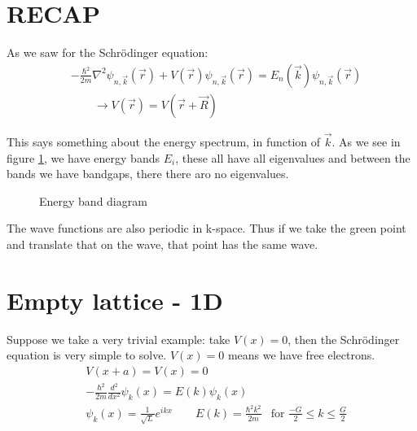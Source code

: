 \section{RECAP}
As we saw for the Schrödinger equation:
\begin{align}
    &-\frac{\hbar^2}{2m}\nabla^2\psi_{n, \vec{k}}(\vec{r}) + V(\vec{r})\psi_{n, \vec{k}}(\vec{r}) = E_n(\vec{k})\psi_{n, \vec{k}}(\vec{r}) \\
    & \qquad \rightarrow V(\vec{r}) = V(\vec{r} + \vec{R})
\end{align}

This says something about the energy spectrum, in function of $\vec{k}$. As we see in figure \ref{fig:energybandiagram}, we have energy bands $E_i$, these all have all eigenvalues and between the bands we have bandgaps, there there aro no eigenvalues.\par
\begin{figure}[h]
    \centering
    \caption{Energy band diagram}
    \label{fig:energybandiagram}
\end{figure}
The wave functions are also periodic in k-space. Thus if we take the green point and translate that on the wave, that point has the same wave.

\section{Empty lattice - 1D}
Suppose we take a very trivial example: take $V(x) = 0$, then the Schrödinger equation is very simple to solve. $V(x) = 0$ means we have free electrons.
\begin{align}
    &V(x+a) = V(x) = 0\\
    &-\frac{\hbar^2}{2m}\frac{d^2}{dx^2}\psi_k(x) = E(k)\psi_k(x)\\
    &\psi_k(x) = \frac{1}{\sqrt{L}}e^{ikx} \qquad E(k) = \frac{\hbar^2k^2}{2m} & \text{for }\frac{-G}{2} \leq k \leq \frac{G}{2}\label{eqn:solution}
\end{align}

